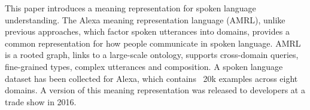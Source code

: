 This paper introduces a meaning representation for spoken language understanding. The Alexa meaning representation language (AMRL), unlike previous approaches, which factor spoken utterances into domains, provides a common representation for how people communicate in spoken language. AMRL is a rooted graph, links to a large-scale ontology, supports cross-domain queries, fine-grained types, complex utterances and composition. A spoken language dataset has been collected for Alexa, which contains ~20k examples across eight domains. A version of this meaning representation was released to developers at a trade show in 2016.
